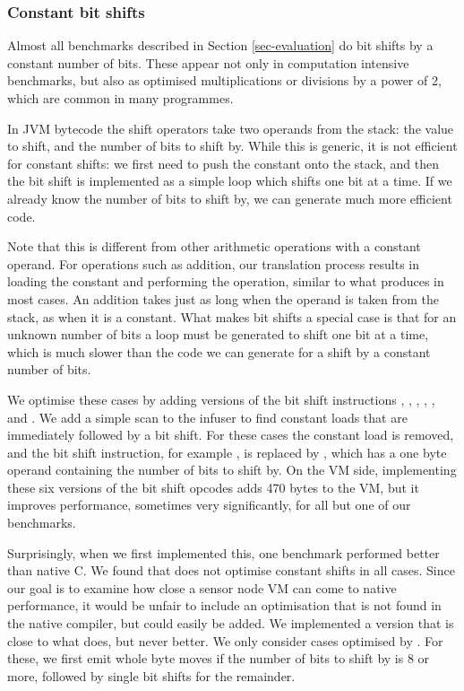 \subsubsection{Constant bit shifts}
\label{sec-opt-constant-shift}

Almost all benchmarks described in Section \ref{sec-evaluation} do bit shifts by a constant number of bits. These appear not only in computation intensive benchmarks, but also as optimised multiplications or divisions by a power of 2, which are common in many programmes.

In JVM bytecode the shift operators take two operands from the stack: the value to shift, and the number of bits to shift by. While this is generic, it is not efficient for constant shifts: we first need to push the constant onto the stack, and then the bit shift is implemented as a simple loop which shifts one bit at a time. If we already know the number of bits to shift by, we can generate much more efficient code.

Note that this is different from other arithmetic operations with a constant operand. For operations such as addition, our translation process results in loading the constant and performing the operation, similar to what  produces in most cases. An addition takes just as long when the operand is taken from the stack, as when it is a constant. What makes bit shifts a special case is that for an unknown number of bits a loop must be generated to shift one bit at a time, which is much slower than the code we can generate for a shift by a constant number of bits.

We optimise these cases by adding  versions of the bit shift instructions , , , , , and . We add a simple scan to the infuser to find constant loads that are immediately followed by a bit shift. For these cases the constant load is removed, and the bit shift instruction, for example , is replaced by , which has a one byte operand containing the number of bits to shift by. On the VM side, implementing these six  versions of the bit shift opcodes adds 470 bytes to the VM, but it improves performance, sometimes very significantly, for all but one of our benchmarks.

Surprisingly, when we first implemented this, one benchmark performed better than native C. We found that  does not optimise constant shifts in all cases. Since our goal is to examine how close a sensor node VM can come to native performance, it would be unfair to include an optimisation that is not found in the native compiler, but could easily be added. We implemented a version that is close to what  does, but never better. We only consider cases optimised by . For these, we first emit whole byte moves if the number of bits to shift by is 8 or more, followed by single bit shifts for the remainder.

